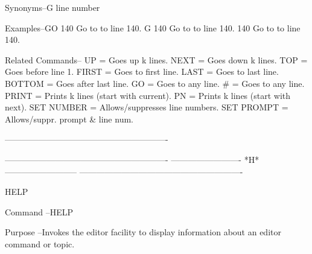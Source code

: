 Synonyms--G
          line number
 
Examples--GO 140            Go to to line 140.
          G 140             Go to to line 140.
          140               Go to to line 140.
 
Related Commands--
          UP              = Goes up k lines.
          NEXT            = Goes down k lines.
          TOP             = Goes before line 1.
          FIRST           = Goes to first line.
          LAST            = Goes to last line.
          BOTTOM          = Goes after last line.
          GO              = Goes to any line.
          #               = Goes to any line.
          PRINT           = Prints k lines (start with current).
          PN              = Prints k lines (start with next).
          SET NUMBER      = Allows/suppresses line numbers.
          SET PROMPT      = Allows/suppr. prompt & line num.
 
----------------------------------------------------------
 
 
 
 
 
 
 
 
 
 
 
 
 
 
 
 
 
 
 
 
 
 
 
 
 
 
 
 
 
 
 
 
 
 
 
 
 
 
 
 
 
 
 
 
 
 
 
 
 
 
 
 
----------------------------------------------------------
-------------------------  *H*  --------------------------
----------------------------------------------------------
 
HELP
 
Command --HELP
 
Purpose --Invokes the editor facility to display
          information about an editor command or topic.
 
